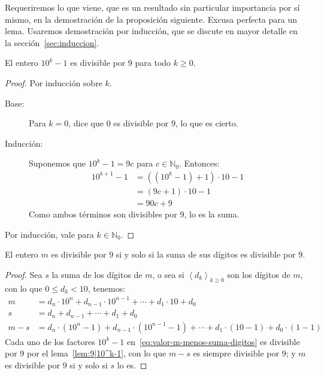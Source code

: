   Requeriremos lo que viene,
  que es un resultado sin particular importancia por sí mismo,
  en la demostración de la proposición siguiente.
  Excusa perfecta para un lema.%
  Usaremos demostración por inducción,
  que se discute
  en mayor detalle en la sección~\ref{sec:induccion}.%
  \begin{lemma}
    \label{lem:9|10^k-1}
    El entero \(10^k - 1\)
    es divisible por \(9\) para todo \(k \ge 0\).
  \end{lemma}
  \begin{proof}
    Por inducción sobre \(k\).
    \begin{description}
    \item[Base:]
      Para \(k = 0\),
      dice que \(0\) es divisible por \(9\),
      lo que es cierto.
    \item[Inducción:]
      Suponemos que \(10^k - 1 = 9 c\) para \(c \in \mathbb{N}_0\).
      Entonces:
      \begin{align*}
	10^{k + 1} - 1
	  &= ((10^k - 1) + 1) \cdot 10 - 1 \\
	  &= (9 c + 1) \cdot 10 - 1 \\
	  &= 90 c + 9
      \end{align*}
      Como ambos términos son divisibles por \(9\),
      lo es la suma.
    \end{description}
    Por inducción,
    vale para \(k \in \mathbb{N}_0\).
  \end{proof}
  \begin{proposition}
    El entero \(m\) es divisible por \(9\) si y solo si
    la suma de sus dígitos es divisible por \(9\).
  \end{proposition}
  \begin{proof}
    Sea \(s\)
    la suma de los dígitos de \(m\),
    o sea si \(\left\langle d_k \right\rangle_{k \ge 0}\)
    son los dígitos de \(m\),
    con lo que \(0 \le d_k < 10\),
    tenemos:
    \begin{align}
      m
	&= d_n \cdot 10^n + d_{n - 1} \cdot 10^{n - 1}
	    + \dotsb + d_1 \cdot 10 + d_0
	\label{eq:valor-m-digitos-decimales} \\
      s
	&= d_n + d_{n - 1} + \dotsb + d_1 + d_0
	\label{eq:valor-suma-digitos-decimales} \\
      m - s
	&= d_n \cdot \left(10^n - 1\right)
	   + d_{n - 1} \cdot \left(10^{n - 1} - 1\right)
	   + \dotsb
	   + d_1 \cdot \left(10 - 1\right) + d_0 \cdot (1 - 1)
	\label{eq:valor-m-menos-suma-digitos}
    \end{align}
    Cada uno de los factores \(10^k - 1\)
    en~\eqref{eq:valor-m-menos-suma-digitos} es divisible por \(9\)
    por el lema~\ref{lem:9|10^k-1},
    con lo que \(m - s\) es siempre divisible por \(9\);
    y \(m\) es divisible por \(9\) si y solo si \(s\) lo es.
  \end{proof}

